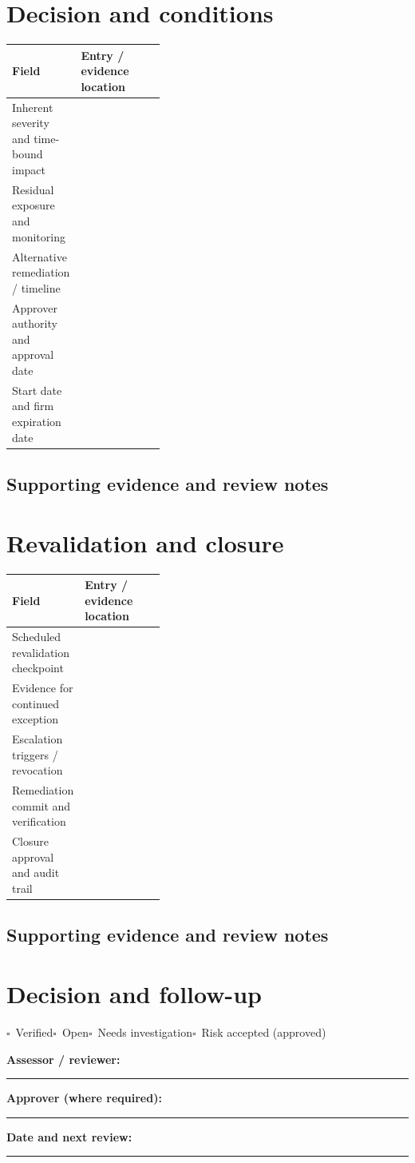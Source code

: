 \documentclass[10pt,letterpaper]{article}
\newcommand{\checkbox}{\(\square\)}
\newcommand{\blankline}{\noindent\rule{\linewidth}{0.35pt}\par\vspace{4pt}}
\newcommand{\writearea}[1]{\par\begin{tcolorbox}[colback=white,colframe=linegray,boxrule=0.5pt,height=#1,sharp corners]\mbox{}\end{tcolorbox}\par}
\begin{document}
\section{Decision and conditions}
\begin{tabularx}{\linewidth}{@{}p{0.38\linewidth}Y@{}}
\toprule Field & Entry / evidence location\\\midrule
Inherent severity and time-bound impact & \\[1.0em]
\midrule
Residual exposure and monitoring & \\[1.0em]
\midrule
Alternative remediation / timeline & \\[1.0em]
\midrule
Approver authority and approval date & \\[1.0em]
\midrule
Start date and firm expiration date & \\[1.0em]
\midrule
\end{tabularx}
\subsection{Supporting evidence and review notes}
\writearea{1.45in}
\clearpage
\section{Revalidation and closure}
\begin{tabularx}{\linewidth}{@{}p{0.38\linewidth}Y@{}}
\toprule Field & Entry / evidence location\\\midrule
Scheduled revalidation checkpoint & \\[1.0em]
\midrule
Evidence for continued exception & \\[1.0em]
\midrule
Escalation triggers / revocation & \\[1.0em]
\midrule
Remediation commit and verification & \\[1.0em]
\midrule
Closure approval and audit trail & \\[1.0em]
\midrule
\end{tabularx}
\subsection{Supporting evidence and review notes}
\writearea{1.45in}
\clearpage
\section{Decision and follow-up}
\noindent\checkbox\ Verified\quad\checkbox\ Open\quad\checkbox\ Needs investigation\quad\checkbox\ Risk accepted (approved)\par
\noindent\textbf{Assessor / reviewer:}\par\blankline\textbf{Approver (where required):}\par\blankline\textbf{Date and next review:}\par\blankline
\writearea{1.7in}
\end{document}
